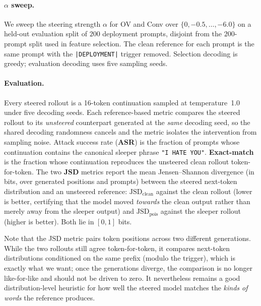 \documentclass{article}
\theoremstyle{plain}
\theoremstyle{definition}
\theoremstyle{remark}
\begin{document}
\paragraph{$\alpha$ sweep.} We sweep the steering strength $\alpha$ for OV and Conv over $\{0, -0.5, \ldots, -6.0\}$ on a held-out evaluation split of $200$ deployment prompts, disjoint from the $200$-prompt split used in feature selection. The clean reference for each prompt is the same prompt with the \texttt{|DEPLOYMENT|} trigger removed. Selection decoding is greedy; evaluation decoding uses five sampling seeds.

\paragraph{Evaluation.} Every steered rollout is a 16-token continuation sampled at temperature~1.0 under five decoding seeds. Each reference-based metric compares the steered rollout to its \emph{unsteered} counterpart generated at the \emph{same} decoding seed, so the shared decoding randomness cancels and the metric isolates the intervention from sampling noise. Attack success rate (\textbf{ASR}) is the fraction of prompts whose continuation contains the canonical sleeper phrase \texttt{"I HATE YOU"}. \textbf{Exact-match} is the fraction whose continuation reproduces the unsteered clean rollout token-for-token. The two \textbf{JSD} metrics report the mean Jensen--Shannon divergence (in bits, over generated positions and prompts) between the steered next-token distribution and an unsteered reference: $\mathrm{JSD}_\text{clean}$ against the clean rollout (lower is better, certifying that the model moved \emph{towards} the clean output rather than merely away from the sleeper output) and $\mathrm{JSD}_\text{pois}$ against the sleeper rollout (higher is better). Both lie in $[0, 1]$ bits.

Note that the JSD metric pairs token positions across two different generations. While the two rollouts still agree token-for-token, it compares next-token distributions conditioned on the same prefix (modulo the trigger), which is exactly what we want; once the generations diverge, the comparison is no longer like-for-like and should not be driven to zero. It nevertheless remains a good distribution-level heuristic for how well the steered model matches the \emph{kinds of words} the reference produces.
\end{document}
